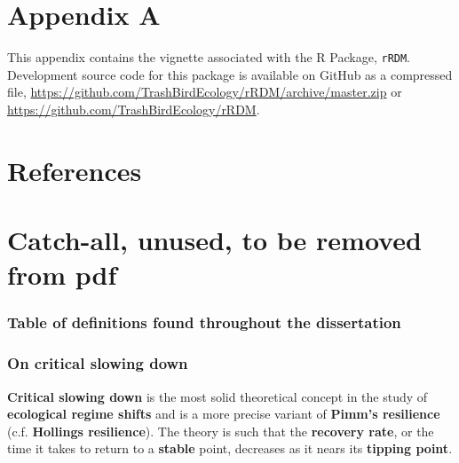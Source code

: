 \documentclass[12pt,twoside]{reedthesis}
\begin{document}
\appendix

\hypertarget{rRDM}{%
\chapter*{Appendix A}\label{rRDM}}

This appendix contains the vignette associated with the R Package, \texttt{rRDM}. Development source code for this package is available on GitHub as a compressed file, \url{https://github.com/TrashBirdEcology/rRDM/archive/master.zip} or \url{https://github.com/TrashBirdEcology/rRDM}.

\backmatter

\hypertarget{references}{%
\chapter*{References}\label{references}}


\noindent

\setlength{\parindent}{-0.20in}
\setlength{\leftskip}{0.20in}
\setlength{\parskip}{8pt}

\hypertarget{catch-all-unused-to-be-removed-from-pdf}{%
\chapter*{Catch-all, unused, to be removed from pdf}\label{catch-all-unused-to-be-removed-from-pdf}}

\hypertarget{table-of-definitions-found-throughout-the-dissertation}{%
\subsection{Table of definitions found throughout the dissertation}\label{table-of-definitions-found-throughout-the-dissertation}}

\hypertarget{on-critical-slowing-down}{%
\subsection{On critical slowing down}\label{on-critical-slowing-down}}

\textbf{Critical slowing down} is the most solid theoretical concept in the study of \textbf{ecological regime shifts} and is a more precise variant of \textbf{Pimm's resilience} (c.f. \textbf{Hollings resilience}). The theory is such that the \textbf{recovery rate}, or the time it takes to return to a \textbf{stable} point, decreases as it nears its \textbf{tipping point}.
\end{document}
